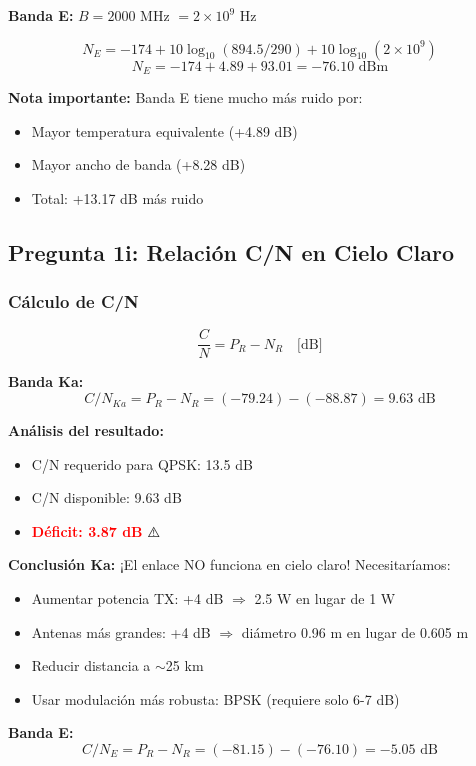 \documentclass[a4paper,10pt]{article}
\begin{document}
\textbf{Banda E:} $B = 2000$ MHz $= 2 \times 10^9$ Hz

$$N_E = -174 + 10\log_{10}(894.5/290) + 10\log_{10}(2 \times 10^9)$$
$$N_E = -174 + 4.89 + 93.01 = \boxed{-76.10 \text{ dBm}}$$

\textbf{Nota importante:} Banda E tiene mucho más ruido por:
\begin{itemize}
    \item Mayor temperatura equivalente (+4.89 dB)
    \item Mayor ancho de banda (+8.28 dB)
    \item Total: +13.17 dB más ruido
\end{itemize}

\subsection{Pregunta 1i: Relación C/N en Cielo Claro}

\subsubsection{Cálculo de C/N}

$$\frac{C}{N} = P_R - N_R \quad \text{[dB]}$$

\textbf{Banda Ka:}
$$C/N_{Ka} = P_R - N_R = (-79.24) - (-88.87) = \boxed{9.63 \text{ dB}}$$

\textbf{Análisis del resultado:}
\begin{itemize}
    \item C/N requerido para QPSK: 13.5 dB
    \item C/N disponible: 9.63 dB
    \item \textcolor{red}{\textbf{Déficit: 3.87 dB}} ⚠️
\end{itemize}

\textbf{Conclusión Ka:} ¡El enlace NO funciona en cielo claro! Necesitaríamos:
\begin{itemize}
    \item Aumentar potencia TX: +4 dB $\Rightarrow$ 2.5 W en lugar de 1 W
    \item Antenas más grandes: +4 dB $\Rightarrow$ diámetro 0.96 m en lugar de 0.605 m
    \item Reducir distancia a $\sim$25 km
    \item Usar modulación más robusta: BPSK (requiere solo 6-7 dB)
\end{itemize}

\textbf{Banda E:}
$$C/N_E = P_R - N_R = (-81.15) - (-76.10) = \boxed{-5.05 \text{ dB}}$$
\end{document}
